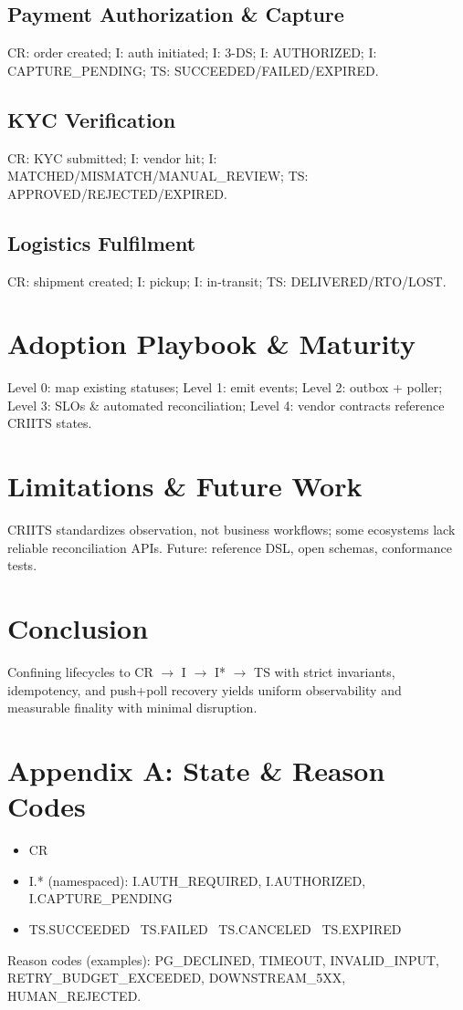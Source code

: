 \documentclass[11pt]{article}
\begin{document}
\subsection{Payment Authorization \& Capture}
CR: order created; I: auth initiated; I: 3-DS; I: AUTHORIZED; I: CAPTURE\_PENDING; TS: SUCCEEDED/FAILED/EXPIRED.
\subsection{KYC Verification}
CR: KYC submitted; I: vendor hit; I: MATCHED/MISMATCH/MANUAL\_REVIEW; TS: APPROVED/REJECTED/EXPIRED.
\subsection{Logistics Fulfilment}
CR: shipment created; I: pickup; I: in-transit; TS: DELIVERED/RTO/LOST.

\section{Adoption Playbook \& Maturity}
Level 0: map existing statuses; Level 1: emit events; Level 2: outbox + poller; Level 3: SLOs \& automated reconciliation; Level 4: vendor contracts reference CRIITS states.

\section{Limitations \& Future Work}
CRIITS standardizes observation, not business workflows; some ecosystems lack reliable reconciliation APIs. Future: reference DSL, open schemas, conformance tests.

\section{Conclusion}
Confining lifecycles to CR $\to$ I $\to$ I* $\to$ TS with strict invariants, idempotency, and push+poll recovery yields uniform observability and measurable finality with minimal disruption.

\appendix
\section{Appendix A: State \& Reason Codes}
\begin{itemize}[leftmargin=*]
\item CR
\item I.* (namespaced): I.AUTH\_REQUIRED, I.AUTHORIZED, I.CAPTURE\_PENDING
\item TS.SUCCEEDED \textbar\ TS.FAILED \textbar\ TS.CANCELED \textbar\ TS.EXPIRED
\end{itemize}
Reason codes (examples): PG\_DECLINED, TIMEOUT, INVALID\_INPUT, RETRY\_BUDGET\_EXCEEDED, DOWNSTREAM\_5XX, HUMAN\_REJECTED.
\end{document}
